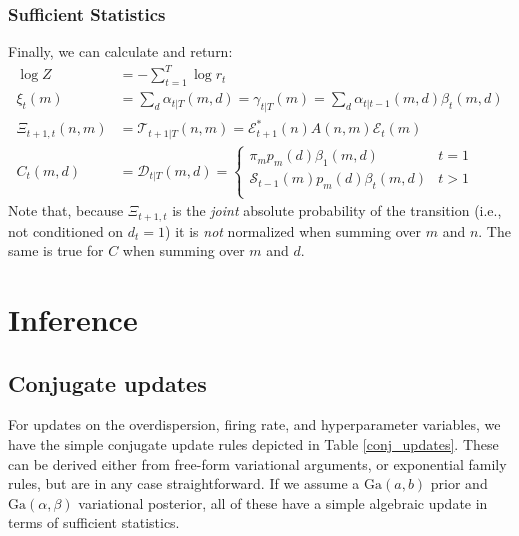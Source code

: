 \documentclass[10pt,letterpaper]{article}
\begin{document}
\subsubsection{Sufficient Statistics}
Finally, we can calculate and return:
\begin{align}
    \log Z &= - \sum_{t=1}^T \log r_t \\
    \xi_t(m) &= \sum_d \alpha_{t|T}(m,d) = \gamma_{t|T}(m) = \sum_d \alpha_{t|t-1}(m, d) \beta_t(m, d) \\
    \Xi_{t+1, t}(n, m) &= \mathcal{T}_{t+1|T}(n, m) = \mathcal{E}^*_{t+1}(n) A(n, m) \mathcal{E}_t(m) \\
    C_t(m, d) &= \mathcal{D}_{t|T}(m, d) =
    \begin{cases}
        \pi_m p_m(d) \beta_1(m, d) & t = 1 \\
        \mathcal{S}_{t-1}(m)p_m(d) \beta_t(m, d) & t > 1 \\
    \end{cases}
\end{align}
Note that, because $\Xi_{t+1, t}$ is the \emph{joint} absolute probability of the transition (i.e., not conditioned on $d_t = 1$) it is \emph{not} normalized when summing over $m$ and $n$. The same is true for $C$ when summing over $m$ and $d$.



\section{Inference}
\subsection{Conjugate updates}
For updates on the overdispersion, firing rate, and hyperparameter variables, we have the simple conjugate update rules depicted in Table \ref{conj_updates}. These can be derived either from free-form variational arguments, or exponential family rules, but are in any case straightforward\cite{Blei2006-oh}. If we assume a $\text{Ga}(a, b)$ prior and $\text{Ga}(\alpha, \beta)$ variational posterior, all of these have a simple algebraic update in terms of sufficient statistics.
\end{document}

